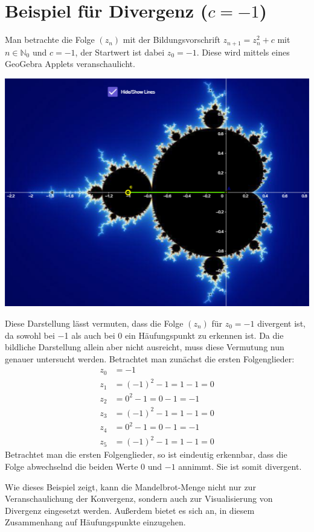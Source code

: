 \documentclass[a4paper, 12pt]{book}
\begin{document}
\section{Beispiel für Divergenz ($c=-1$)}

Man betrachte die Folge \(\left( z_{n} \right)\) mit der
Bildungsvorschrift \(z_{n + 1} = z_{n}^{2} + c\) mit
\(n \in \mathbb{N}_{0}\) und \(c =  - 1\), der Startwert ist dabei
\(z_{0} =  - 1\). Diese wird mittels eines GeoGebra Applets
veranschaulicht.

\begin{center}
\includegraphics[width=0.5\linewidth]{image10.png}
\end{center}


Diese Darstellung lässt vermuten, dass die Folge
\(\left( z_{n} \right)\) für \(z_{0} =  - 1\) divergent ist, da
sowohl bei \(-\)1 als auch bei 0 ein Häufungspunkt zu erkennen ist. Da
die bildliche Darstellung allein aber nicht ausreicht, muss diese
Vermutung nun genauer untersucht werden. Betrachtet man zunächst die
ersten Folgenglieder:
\begin{align*}
z_{0} &=  - 1 \\
z_{1} &= ( - 1)^{2} - 1 = 1 - 1 = 0 \\
z_{2} &= 0^{2} - 1 = 0 - 1 =  - 1 \\
z_{3} &= ( - 1)^{2} - 1 = 1 - 1 = 0 \\
z_{4} &= 0^{2} - 1 = 0 - 1 =  - 1 \\
z_{5} &= ( - 1)^{2} - 1 = 1 - 1 = 0
\end{align*}
Betrachtet man die ersten Folgenglieder, so ist eindeutig erkennbar,
dass die Folge abwechselnd die beiden Werte 0 und \(-1\) annimmt. Sie
ist somit divergent.

Wie dieses Beispiel zeigt, kann die Mandelbrot-Menge nicht nur zur
Veranschaulichung der Konvergenz, sondern auch zur Visualisierung von
Divergenz eingesetzt werden. Außerdem bietet es sich an, in diesem
Zusammenhang auf Häufungspunkte einzugehen.
\end{document}
